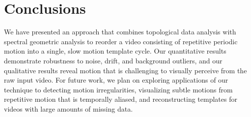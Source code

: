 \documentclass{article}
\begin{document}
\section{Conclusions}

We have presented an approach that combines topological data analysis with spectral geometric analysis to reorder a video consisting of repetitive periodic motion into a single, slow motion template cycle.
Our quantitative results demonstrate robustness to noise, drift, and background outliers, and our qualitative results reveal motion that is challenging to visually perceive from the raw input video.
For future work, we plan on exploring applications of our technique to detecting motion irregularities, visualizing subtle motions from repetitive motion that is temporally aliased, and reconstructing templates for videos with large amounts of missing data.



\footnotesize

\end{document}
